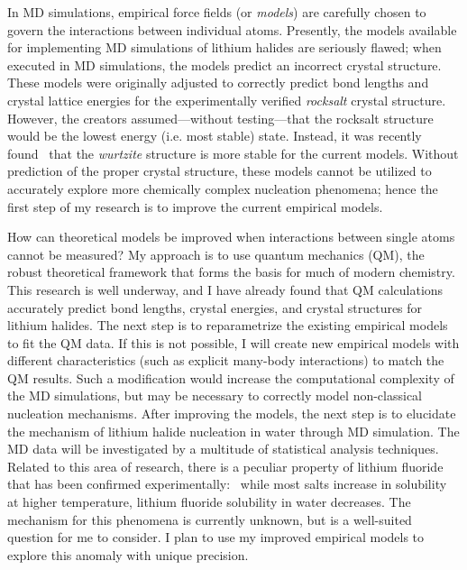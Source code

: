 \documentclass[notitlepage,letterpaper,onecolumn,12pt,final]{article}
\begin{document}
In MD simulations, empirical force fields (or \emph{models}) are carefully chosen to govern the interactions between individual atoms. Presently, the models available for implementing MD simulations of lithium halides are seriously flawed; when executed in MD simulations, the models predict an incorrect crystal structure.~\supercite{Lanaro2017a} These models were originally adjusted to correctly predict bond lengths and crystal lattice energies for the experimentally verified \emph{rocksalt} crystal structure. However, the creators assumed---without testing---that the rocksalt structure would be the lowest energy (i.e. most stable) state. Instead, it was recently found~\supercite{Lanaro2017a} that the \emph{wurtzite} structure is more stable for the current models. Without prediction of the proper crystal structure, these models cannot be utilized to accurately explore more chemically complex nucleation phenomena; hence the first step of my research is to improve the current empirical models.

How can theoretical models be improved when interactions between single atoms cannot be measured? My approach is to use quantum mechanics (QM), the robust theoretical framework that forms the basis for much of modern chemistry. This research is well underway, and I have already found that QM calculations accurately predict bond lengths, crystal energies, and crystal structures for lithium halides. The next step is to reparametrize the existing empirical models to fit the QM data. If this is not possible, I will create new empirical models with different characteristics (such as explicit many-body interactions) to match the QM results. Such a modification would increase the computational complexity of the MD simulations, but may be necessary to correctly model non-classical nucleation mechanisms. After improving the models, the next step is to elucidate the mechanism of lithium halide nucleation in water through MD simulation. The MD data will be investigated by a multitude of statistical analysis techniques. Related to this area of research, there is a peculiar property of lithium fluoride that has been confirmed experimentally:~\supercite{Booth1950} while most salts increase in solubility at higher temperature, lithium fluoride solubility in water decreases. The mechanism for this phenomena is currently unknown, but is a well-suited question for me to consider. I plan to use my improved empirical models to explore this anomaly with unique precision. 

\printbibliography[heading=none]
\end{document}
